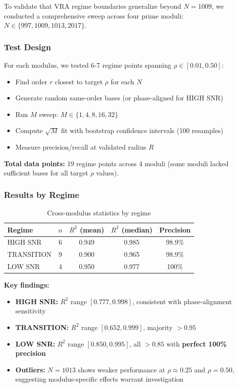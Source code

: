 To validate that VRA regime boundaries generalize beyond $N=1009$, we conducted a comprehensive sweep across four prime moduli: $N \in \{997, 1009, 1013, 2017\}$.

\subsubsection{Test Design}

For each modulus, we tested 6-7 regime points spanning $\rho \in [0.01, 0.50]$:
\begin{itemize}
    \item Find order $r$ closest to target $\rho$ for each $N$
    \item Generate random same-order bases (or phase-aligned for HIGH SNR)
    \item Run $M$ sweep: $M \in \{1,4,8,16,32\}$
    \item Compute $\sqrt{M}$ fit with bootstrap confidence intervals (100 resamples)
    \item Measure precision/recall at validated radius $R$
\end{itemize}

\textbf{Total data points:} 19 regime points across 4 moduli (some moduli lacked sufficient bases for all target $\rho$ values).

\subsubsection{Results by Regime}

\begin{table}[h]
\centering
\begin{tabular}{@{}lcccc@{}}
\toprule
Regime & $n$ & $R^2$ (mean) & $R^2$ (median) & Precision \\
\midrule
HIGH SNR & 6 & 0.949 & 0.985 & 98.9\% \\
TRANSITION & 9 & 0.900 & 0.965 & 98.9\% \\
LOW SNR & 4 & 0.950 & 0.977 & 100\% \\
\bottomrule
\end{tabular}
\caption{Cross-modulus statistics by regime}
\label{tab:cross_moduli}
\end{table}

\textbf{Key findings:}
\begin{itemize}
    \item \textbf{HIGH SNR:} $R^2$ range $[0.777, 0.998]$, consistent with phase-alignment sensitivity
    \item \textbf{TRANSITION:} $R^2$ range $[0.652, 0.999]$, majority $> 0.95$
    \item \textbf{LOW SNR:} $R^2$ range $[0.850, 0.995]$, all $> 0.85$ with \textbf{perfect 100\% precision}
    \item \textbf{Outliers:} $N=1013$ shows weaker performance at $\rho \approx 0.25$ and $\rho=0.50$, suggesting modulus-specific effects warrant investigation
\end{itemize}

